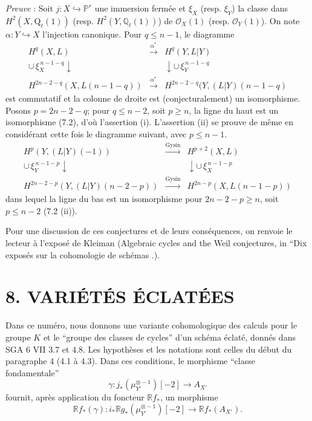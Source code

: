 \emph{Preuve} : Soit $j:X\hookrightarrow\mathbb{P}^r$ une immersion fermée et $\xi_X$ (resp. $\xi_Y$) la classe dans $H^2(X,\mathrm{Q}_\ell(1))$ (resp. $H^2(Y,\mathbb{Q}_\ell(1))$) de $\mathcal{O}_X(1)$ (resp. $\mathcal{O}_Y(1)$). On note $\alpha:Y\hookrightarrow X$ l'injection canonique. Pour $q\le n-1$, le diagramme
\[
\begin{array}{ccc}
H^q(X,L)&\xrightarrow{\alpha^*}&H^q(Y,L|Y)\\
\cup\,\xi_X^{\,n-1-q}\downarrow&&\downarrow\cup\,\xi_Y^{\,n-1-q}\\
H^{2n-2-q}(X,L(n-1-q))&\xrightarrow{\alpha^*}&
H^{2n-2-q}(Y,(L|Y)(n-1-q)
\end{array}
\]
est commutatif et la colonne de droite est (conjecturalement) un isomorphisme. Posons $p=2n-2-q$; pour $q\le n-2$, soit $p\ge n$, la ligne du haut est un isomorphisme (7.2), d'où l'assertion (i). L'assertion (ii) se prouve de même en considérant cette fois le diagramme suivant, avec $p\le n-1$.
\[
\begin{array}{ccc}
H^p(Y,(L|Y)(-1))&
\xrightarrow{\mathrm{Gysin}}&H^{p+2}(X,L)\\
\cup\,\xi_Y^{\,n-1-p}\downarrow&&\downarrow\cup\,\xi_X^{\,n-1-p}\\
H^{2n-2-p}(Y,(L|Y)(n-2-p))&\xrightarrow{\mathrm{Gysin}}&
H^{2n-p}(X,L(n-1-p))
\end{array}
\]
dans lequel la ligne du bas est un isomorphisme pour $2n-2-p\ge n$, soit $p\le n-2$ (7.2 (ii)).

Pour une discussion de ces conjectures et de leurs conséquences, on renvoie le lecteur à l'exposé de Kleiman (Algebraic cycles and the Weil conjectures, in ``Dix exposés sur la cohomologie de schémas .).

\section*{8. VARIÉTÉS ÉCLATÉES}

Dans ce numéro, nous donnons une variante cohomologique des calculs pour le groupe $K$ et le ``groupe des classes de cycles'' d'un schéma éclaté, donnés dans SGA 6 VII 3.7 et 4.8. Les hypothèses et les notations sont celles du début du paragraphe 4 (4.1 à 4.3). Dans ces conditions, le morphisme ``classe fondamentale''
\[
\gamma:j_*(\mu_{Y'}^{\otimes -1})[-2]\to A_{X'}
\]
fournit, après application du foncteur $\mathbb{R} f_*$, un morphisme
\[
\mathbb{R} f_*(\gamma):i_*\mathbb{R} g_*(\mu_{Y'}^{\otimes -1})[-2]\to \mathbb{R} f_*(A_{X'}).
\]

